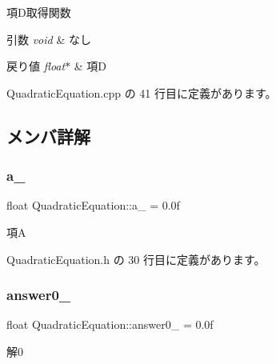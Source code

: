 項\+D取得関数 


\begin{DoxyParams}{引数}
{\em void} & なし \\
\hline
\end{DoxyParams}

\begin{DoxyRetVals}{戻り値}
{\em float$\ast$} & 項D \\
\hline
\end{DoxyRetVals}


 Quadratic\+Equation.\+cpp の 41 行目に定義があります。



\subsection{メンバ詳解}
\mbox{\label{class_quadratic_equation_ac12480b2ea372fab869fc304dd11a235}} 
\subsubsection{\texorpdfstring{a\+\_\+}{a\_}}
{\footnotesize\ttfamily float Quadratic\+Equation\+::a\+\_\+ = 0.\+0f\hspace{0.3cm}{\ttfamily [private]}}



項A 



 Quadratic\+Equation.\+h の 30 行目に定義があります。

\mbox{\label{class_quadratic_equation_a124202dc6328fc32d2c3e203da5c2c4d}} 
\subsubsection{\texorpdfstring{answer0\+\_\+}{answer0\_}}
{\footnotesize\ttfamily float Quadratic\+Equation\+::answer0\+\_\+ = 0.\+0f\hspace{0.3cm}{\ttfamily [private]}}



解0 



